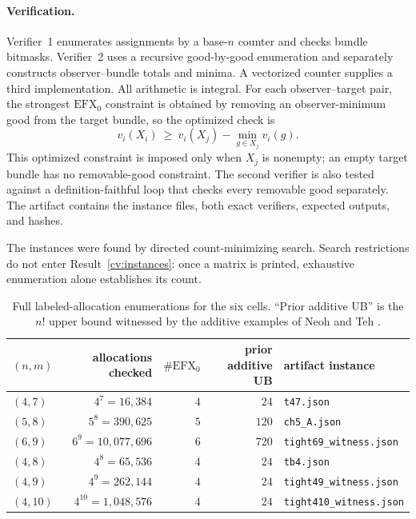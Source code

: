 \documentclass[11pt]{article}
\theoremstyle{plain}
\theoremstyle{definition}
\newcommand{\efxo}{\mathrm{EFX}_0}
\begin{document}
\paragraph{Verification.}
Verifier~1 enumerates assignments by a base-$n$ counter and checks bundle
bitmasks.  Verifier~2 uses a recursive good-by-good enumeration and separately
constructs observer--bundle totals and minima.  A vectorized counter supplies a
third implementation.  All arithmetic is integral.  For each observer--target
pair, the strongest $\efxo$ constraint is obtained by removing an
observer-minimum good from the target bundle, so the optimized check is
\[
  v_i(X_i)\ \ge\
  v_i(X_j)-\min_{g\in X_j}v_i(g).
\]
This optimized constraint is imposed only when $X_j$ is nonempty; an empty
target bundle has no removable-good constraint.
The second verifier is also tested against a definition-faithful loop that checks
every removable good separately.  The artifact contains the instance files,
both exact verifiers, expected outputs, and hashes.

The instances were found by directed count-minimizing search.  Search restrictions
do not enter Result~\ref{cv:instances}: once a matrix is printed, exhaustive
enumeration alone establishes its count.

\begin{table}[H]
\centering
\begin{tabular}{@{}lrrrl@{}}
\toprule
$(n,m)$ & allocations checked & $\#\efxo$ & prior additive UB & artifact instance \\
\midrule
$(4,7)$  & $4^7=16{,}384$       & $4$ & $24$  & \texttt{t47.json}\\
$(5,8)$  & $5^8=390{,}625$      & $5$ & $120$ & \texttt{ch5\_A.json}\\
$(6,9)$  & $6^9=10{,}077{,}696$ & $6$ & $720$ & \texttt{tight69\_witness.json}\\
$(4,8)$  & $4^8=65{,}536$       & $4$ & $24$  & \texttt{tb4.json}\\
$(4,9)$  & $4^9=262{,}144$      & $4$ & $24$  & \texttt{tight49\_witness.json}\\
$(4,10)$ & $4^{10}=1{,}048{,}576$ & $4$ & $24$ & \texttt{tight410\_witness.json}\\
\bottomrule
\end{tabular}
\caption{Full labeled-allocation enumerations for the six cells.  ``Prior
additive UB'' is the $n!$ upper bound witnessed by the additive examples of
Neoh and Teh \cite{NeohTeh2025}.}
\label{tab:counts}
\end{table}
\end{document}
